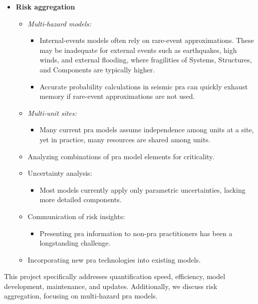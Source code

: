 \begin{itemize}
\item \textbf{Risk aggregation}
\begin{itemize}
    \item \textit{Multi-hazard models:}
    \begin{itemize}
        \item Internal-events models often rely on rare-event approximations. These may be inadequate for external events such as earthquakes, high winds, and external flooding, where fragilities of Systems, Structures, and Components are typically higher.
        \item Accurate probability calculations in seismic \acrshort{pra} can quickly exhaust memory if rare-event approximations are not used.
    \end{itemize}
    \item \textit{Multi-unit sites:}
    \begin{itemize}
        \item Many current \acrshort{pra} models assume independence among units at a site, yet in practice, many resources are shared among units.
    \end{itemize}
    \item Analyzing combinations of \acrshort{pra} model elements for criticality.
    \item Uncertainty analysis:
    \begin{itemize}
        \item Most models currently apply only parametric uncertainties, lacking more detailed components.
    \end{itemize}
    \item Communication of risk insights:
    \begin{itemize}
        \item Presenting \acrshort{pra} information to non-\acrshort{pra} practitioners has been a longstanding challenge.
    \end{itemize}
    \item Incorporating new \acrshort{pra} technologies into existing models.
\end{itemize}
\end{itemize}

This project specifically addresses quantification speed, efficiency, model development, maintenance, and updates. Additionally, we discuss risk aggregation, focusing on multi-hazard \acrshort{pra} models.